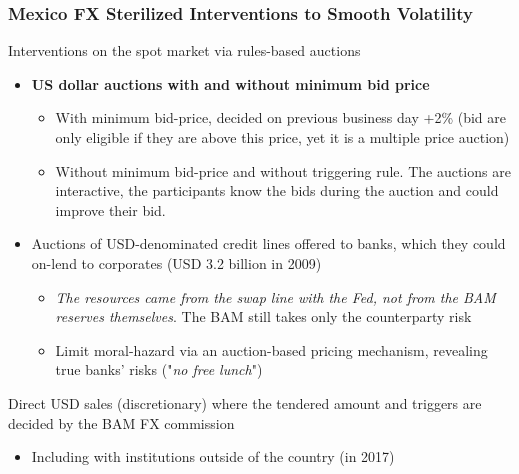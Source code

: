 \documentclass{beamer}
\newenvironment{wideitemize}{\itemize\addtolength{\itemsep}{10pt}}{\enditemize}
\begin{document}
\begin{frame}
  \frametitle{Mexico FX Sterilized Interventions to Smooth Volatility}

  \begin{wideitemize}
  \item Interventions on the spot market via rules-based auctions
    \begin{itemize}
    \item \textbf{US dollar auctions with and without minimum bid price}
      \begin{itemize}
      \item With minimum bid-price, decided on previous business day +2\% (bid are only eligible if they are above this price, yet it is a multiple price auction)
      \item Without minimum bid-price and without triggering rule. The auctions are interactive, the participants know the bids during the auction and could improve their bid.
      \end{itemize}
      
    \item Auctions of USD-denominated credit lines offered to banks, which they could on-lend to corporates (USD 3.2 billion in 2009)
      \begin{itemize}
      \item \emph{The resources came from the swap line with the Fed, not from the BAM reserves themselves}. The BAM still takes only the counterparty risk
      \item Limit moral-hazard via an auction-based pricing mechanism, revealing true banks' risks ("\emph{no free lunch}")
      \end{itemize}
    \end{itemize}
    
  \item Direct USD sales (discretionary) where the tendered amount and triggers are decided by the BAM FX commission
    \begin{itemize}
    \item Including with institutions outside of the country (in 2017) 
    \end{itemize}
  \end{wideitemize}
  
\end{frame}
\end{document}
